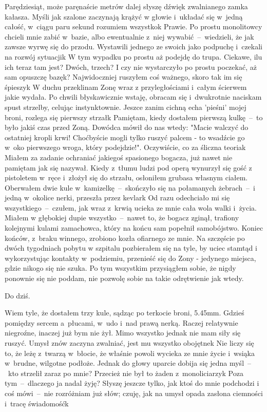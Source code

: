 \documentclass[../MAIN.tex]{subfiles}
\begin{document}
Parędziesiąt, może paręnaście metrów dalej słyszę dźwięk
zwalnianego zamka kałasza. Myśli jak szalone zaczynają krążyć w
głowie i~układać się w~jedną całość, w~ciągu paru sekund
rozumiem wszystko\3k Prawie. Po prostu monolitowcy chcieli mnie
zabić w~bazie, albo ewentualnie z~niej wywabić~--~wiedzieli, że
jak zawsze wyrwę się do przodu. Wystawili jednego ze swoich
jako podpuchę i~czekali na rozwój sytuacji\3k W tym wypadku po
prostu aż podejdę do trupa. Ciekawe, ilu ich teraz tam jest?
Dwóch, trzech? I czy nie wystarczyło po prostu poczekać, aż sam
opuszczę bazę\3k? Najwidoczniej ruszyłem coś ważnego, skoro tak
im się śpieszy\3k W duchu przeklinam Zonę wraz z
przyległościami i~całym ścierwem jakie wydała. Po chwili
błyskawicznie wstaję, obracam się i~dwukrotnie naciskam spust
strzelby, celując instynktownie. Jeszce zanim cichną echa
'pieśni' mojej broni, rozlega się pierwszy strzał\3k
%
%
Pamiętam, kiedy dostałem pierwszą kulkę~--~to było jakiś czas
przed Zoną. Dowódca mówił do nas wtedy: "Macie walczyć do
ostatniej kropli krwi! Choćbyście mogli tylko ruszyć palcem -
to wsadźcie go w~oko pierwszego wroga, który podejdzie!".
Oczywiście, co za śliczna teoria\3k Miałem za zadanie ochraniać
jakiegoś spasionego bogacza, już nawet nie pamiętam jak się
nazywał. Kiedy z~tłumu ludzi pod operą wynurzył się gość z
pistoletem w~ręce i~złożył się do strzału, osłoniłem grubasa
własnym ciałem. Oberwałem dwie kule w~kamizelkę~--~skończyło
się
na połamanych żebrach~--~i jedną w~okolice nerki, przeszła
przez
kevlar\3k Od razu odechciało mi się wszystkiego~--~czułem, jak
wraz z~krwią ucieka ze mnie cała wola walki i~życia. Miałem w
głębokiej dupie wszystko~--~nawet to, że bogacz zginął,
trafiony
kolejnymi kulami zamachowca, który na końcu sam popełnił
samobójstwo. Koniec końców, z~braku winnego, zrobiono kozła
ofiarnego ze mnie. Na szczęście po dwóch tygodniach pobytu w
szpitalu pozbierałem się na tyle, by uciec stamtąd i
wykorzystując kontakty w~podziemiu, przenieść się do Zony -
jedynego miejsca, gdzie nikogo się nie szuka. Po tym wszystkim
przysiągłem sobie, że nigdy ponownie się nie poddam, nie
pozwolę sobie na takie odrętwienie jak wtedy.

Do dziś.

Wiem tyle, że dostałem trzy kule, sądząc po terkocie broni,
5.45mm. Gdzieś pomiędzy sercem a~płucami, w~udo i~nad prawą
nerką. Raczej relatywnie niegroźne, inaczej już bym nie żył.
Mimo wszystko jednak nie mam siły się ruszyć. Umysł znów
zaczyna zwalniać, jest mu wszystko obojętne\3k Nie liczy się
to, że leżę z~twarzą w~błocie, że właśnie powoli wycieka ze
mnie życie i~wsiąka w~brudne, wilgotne podłoże. Jednak do głowy
uparcie dobija się jedna myśl~--~kto strzelił zaraz po mnie?
Przecież nie był to żaden z~monoliciarzy\3k Poza
tym~--~dlaczego
ja nadal żyję? Słyszę jeszcze tylko, jak ktoś do mnie podchodzi
i coś mówi~--~nie rozróżniam już słów; czuję, jak na umysł
opada
zasłona ciemności i~tracę świadomość\3k
\end{document}
